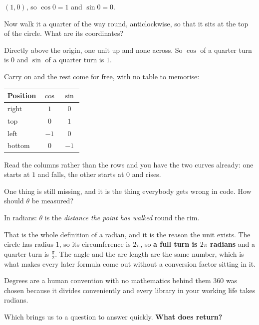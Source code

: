 \begin{fr}
\begin{ansblock}
$(1, 0)$, so $\cos 0 = 1$ and $\sin 0 = 0$.
\end{ansblock}

Now walk it a quarter of the way round, anticlockwise, so that it sits at the
top of the circle. What are its coordinates?
\nextframe
\end{fr}

\begin{fr}
Directly above the origin, one unit up and none across. So $\cos$ of a quarter
turn is $0$ and $\sin$ of a quarter turn is $1$.

Carry on and the rest come for free, with no table to memorise:

\begin{center}
\begin{tabular}{lcc}
\toprule
Position & $\cos$ & $\sin$ \\
\midrule
right & $1$ & $0$ \\
top & $0$ & $1$ \\
left & $-1$ & $0$ \\
bottom & $0$ & $-1$ \\
\bottomrule
\end{tabular}
\end{center}

Read the columns rather than the rows and you have the two curves already: one
starts at $1$ and falls, the other starts at $0$ and rises.

One thing is still missing, and it is the thing everybody gets wrong in code.
How should $\theta$ be measured?
\nextframe
\end{fr}

\begin{fr}
\begin{ansblock}
In radians: $\theta$ is the \emph{distance the point has walked} round the rim.
\end{ansblock}

That is the whole definition of a radian, and it is the reason the unit exists.
The circle has radius $1$, so its circumference is $2\pi$, so \textbf{a full
turn is $2\pi$ radians} and a quarter turn is $\frac{\pi}{2}$. The angle and
the arc length are the same number, which is what makes every later formula
come out without a conversion factor sitting in it.

Degrees are a human convention with no mathematics behind them \dash{} $360$
was chosen because it divides conveniently \dash{} and every library in your
working life takes radians.

Which brings us to a question to answer quickly. \textbf{What does
 return?}
\dotline
\nextframe
\end{fr}

